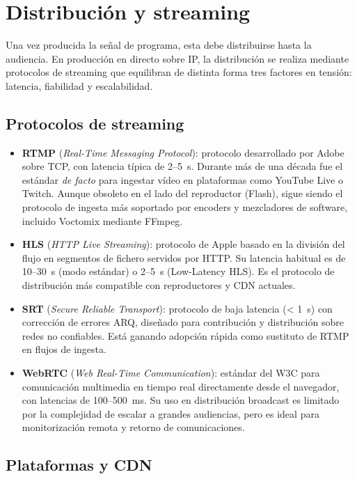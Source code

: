 \section{Distribución y streaming}

Una vez producida la señal de programa, esta debe distribuirse hasta la audiencia.
En producción en directo sobre IP, la distribución se realiza mediante protocolos de
streaming que equilibran de distinta forma tres factores en tensión: latencia,
fiabilidad y escalabilidad.

\subsection{Protocolos de streaming}

\begin{itemize}
  \item \textbf{RTMP} (\textit{Real-Time Messaging Protocol}): protocolo desarrollado
  por Adobe sobre TCP, con latencia típica de 2--5~s. Durante más de una década fue
  el estándar \textit{de facto} para ingestar vídeo en plataformas como YouTube Live
  o Twitch. Aunque obsoleto en el lado del reproductor (Flash), sigue siendo el
  protocolo de ingesta más soportado por encoders y mezcladores de software, incluido
  Voctomix mediante FFmpeg.
  \item \textbf{HLS} (\textit{HTTP Live Streaming}): protocolo de Apple basado en la
  división del flujo en segmentos de fichero servidos por HTTP. Su latencia habitual
  es de 10--30~s (modo estándar) o 2--5~s (Low-Latency HLS). Es el protocolo de
  distribución más compatible con reproductores y CDN actuales.
  \item \textbf{SRT} (\textit{Secure Reliable Transport}): protocolo de baja latencia
  (< 1~s) con corrección de errores ARQ, diseñado para contribución y distribución
  sobre redes no confiables. Está ganando adopción rápida como sustituto de RTMP en
  flujos de ingesta.
  \item \textbf{WebRTC} (\textit{Web Real-Time Communication}): estándar del W3C para
  comunicación multimedia en tiempo real directamente desde el navegador, con latencias
  de 100--500~ms. Su uso en distribución broadcast es limitado por la complejidad de
  escalar a grandes audiencias, pero es ideal para monitorización remota y retorno
  de comunicaciones.
\end{itemize}

\subsection{Plataformas y CDN}

